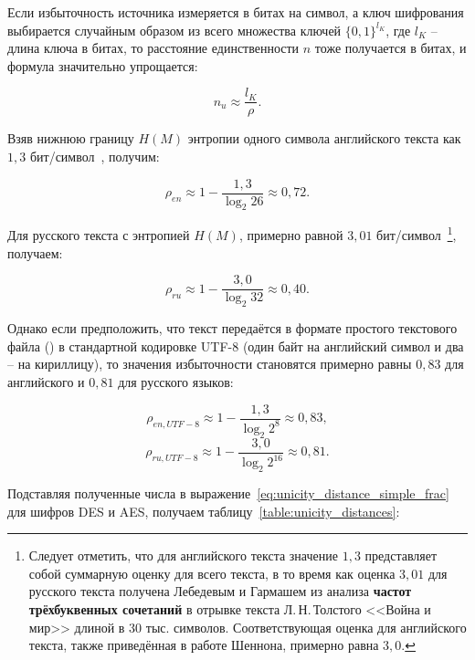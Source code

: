Если избыточность источника измеряется в битах на символ, а ключ шифрования выбирается случайным образом из всего множества ключей $\{0, 1\}^{l_K}$, где $l_K$ -- длина ключа в битах, то расстояние единственности $n$ тоже получается в битах, и формула значительно упрощается:

\begin{equation}\label{eq:unicity_distance_simple_frac}
n_u \approx \frac{l_K}{\rho}.
\end{equation}

Взяв нижнюю границу $H(M)$ энтропии одного символа английского текста как $1{,}3$ бит/символ~\cite{Shannon:1951, Schneier:2002}, получим:

	\[ \rho _{en} \approx 1 - \frac{ 1{,}3 }{ \log _2 {26} } \approx 0{,}72.\]

Для русского текста с энтропией $H(M)$, примерно равной $3{,}01$ бит/символ~\cite{Lebedev:1958}\footnote{Следует отметить, что для английского текста значение $1{,}3$ представляет собой суммарную оценку для всего текста, в то время как оценка $3{,}01$ для русского текста получена Лебедевым и Гармашем из анализа \textbf{частот трёхбуквенных сочетаний} в отрывке текста Л.\,Н.\,Толстого <<Война и мир>> длиной в 30 тыс. символов. Соответствующая оценка для английского текста, также приведённая в работе Шеннона, примерно равна $3{,}0$.}, получаем:

	\[ \rho _{ru} \approx 1 - \frac{ 3{,}0 }{ \log _2 {32} } \approx 0{,}40.\]

Однако если предположить, что текст передаётся в формате простого текстового файла () в стандартной кодировке UTF-8 (один байт на английский символ и два -- на кириллицу), то значения избыточности становятся примерно равны $0{,}83$ для английского и $0{,}81$ для русского языков:

	\[ \rho _{en, UTF-8} \approx 1 - \frac{ 1{,}3 }{ \log _2 {2^{8}} } \approx 0{,}83,\]
	\[ \rho _{ru, UTF-8} \approx 1 - \frac{ 3{,}0 }{ \log _2 {2^{16}} } \approx 0{,}81.\]

Подставляя полученные числа в выражение~\ref{eq:unicity_distance_simple_frac} для шифров DES и AES, получаем таблицу~\ref{table:unicity_distances}:

